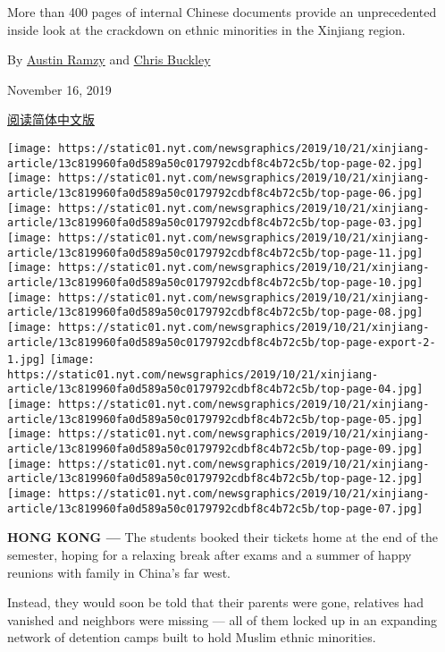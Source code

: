 More than 400 pages of internal Chinese documents provide an
unprecedented inside look at the crackdown on ethnic minorities in the
Xinjiang region.

By \href{https://www.nytimes.com/by/austin-ramzy}{Austin Ramzy} and
\href{https://www.nytimes.com/by/chris-buckley}{Chris Buckley}

November 16, 2019

\href{https://www.nytimes.com/zh/2019/11/16/world/asia/xinjiang-documents-chinese.html}{阅读简体中文版}

\texttt{[image: https://static01.nyt.com/newsgraphics/2019/10/21/xinjiang-article/13c819960fa0d589a50c0179792cdbf8c4b72c5b/top-page-02.jpg]}
\texttt{[image: https://static01.nyt.com/newsgraphics/2019/10/21/xinjiang-article/13c819960fa0d589a50c0179792cdbf8c4b72c5b/top-page-06.jpg]}
\texttt{[image: https://static01.nyt.com/newsgraphics/2019/10/21/xinjiang-article/13c819960fa0d589a50c0179792cdbf8c4b72c5b/top-page-03.jpg]}
\texttt{[image: https://static01.nyt.com/newsgraphics/2019/10/21/xinjiang-article/13c819960fa0d589a50c0179792cdbf8c4b72c5b/top-page-11.jpg]}
\texttt{[image: https://static01.nyt.com/newsgraphics/2019/10/21/xinjiang-article/13c819960fa0d589a50c0179792cdbf8c4b72c5b/top-page-10.jpg]}
\texttt{[image: https://static01.nyt.com/newsgraphics/2019/10/21/xinjiang-article/13c819960fa0d589a50c0179792cdbf8c4b72c5b/top-page-08.jpg]}
\texttt{[image: https://static01.nyt.com/newsgraphics/2019/10/21/xinjiang-article/13c819960fa0d589a50c0179792cdbf8c4b72c5b/top-page-export-2-1.jpg]}
\texttt{[image: https://static01.nyt.com/newsgraphics/2019/10/21/xinjiang-article/13c819960fa0d589a50c0179792cdbf8c4b72c5b/top-page-04.jpg]}
\texttt{[image: https://static01.nyt.com/newsgraphics/2019/10/21/xinjiang-article/13c819960fa0d589a50c0179792cdbf8c4b72c5b/top-page-05.jpg]}
\texttt{[image: https://static01.nyt.com/newsgraphics/2019/10/21/xinjiang-article/13c819960fa0d589a50c0179792cdbf8c4b72c5b/top-page-09.jpg]}
\texttt{[image: https://static01.nyt.com/newsgraphics/2019/10/21/xinjiang-article/13c819960fa0d589a50c0179792cdbf8c4b72c5b/top-page-12.jpg]}
\texttt{[image: https://static01.nyt.com/newsgraphics/2019/10/21/xinjiang-article/13c819960fa0d589a50c0179792cdbf8c4b72c5b/top-page-07.jpg]}

\textbf{HONG KONG ---} The students booked their tickets home at the end
of the semester, hoping for a relaxing break after exams and a summer of
happy reunions with family in China's far west.

Instead, they would soon be told that their parents were gone, relatives
had vanished and neighbors were missing --- all of them locked up in an
expanding network of detention camps built to hold Muslim ethnic
minorities.

